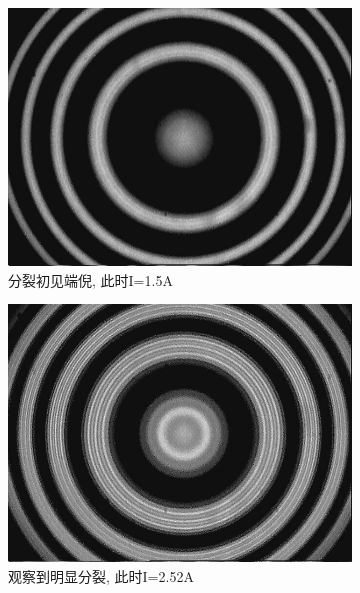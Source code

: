 \documentclass[12pt,a4paper]{article}
\begin{document}
\begin{figure}[H]
    \centering
    \begin{subfigure}[b]{0.3\textwidth}
      \centering
      \includegraphics[width=\textwidth]{MultiRings@1.5A.jpg}
      \caption{分裂初见端倪, 此时I=1.5A}
    \end{subfigure}
    \hfill
    \begin{subfigure}[b]{0.3\textwidth}
      \centering
      \includegraphics[width=\textwidth]{MultiRings@2.52A.jpg}
      \caption{观察到明显分裂, 此时I=2.52A}
    \end{subfigure}
    \hfill
    \begin{subfigure}[b]{0.3\textwidth}
      \centering

\end{subfigure}
\end{figure}
\end{document}
